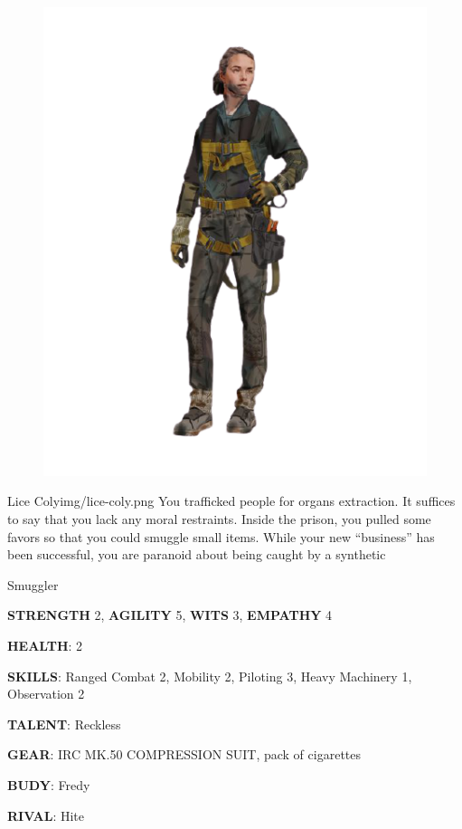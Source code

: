 \begin{figure}
    \hspace*{-2in}
    \includegraphics[width=.85\textwidth]{img/bg/firefighter-5.png}
    \label{fig:refinery}
\end{figure}

\medskip \medskip \medskip \medskip \medskip \medskip \medskip \medskip 

\begin{rpg-pcbox}{Lice Coly}{img/lice-coly.png}
    You trafficked people for organs extraction. It suffices to say that you lack any moral restraints.
    Inside the prison, you pulled some favors so that you could smuggle small items. While your new ``business'' has been successful, you are paranoid about being caught by a synthetic
\end{rpg-pcbox}

\begin{rpg-commentbox}{}
    Smuggler

    \textbf{STRENGTH} 2, \textbf{AGILITY} 5, \textbf{WITS} 3, \textbf{EMPATHY} 4

    \textbf{HEALTH}: 2

    \textbf{SKILLS}: Ranged Combat 2, Mobility 2, Piloting 3, Heavy Machinery 1, Observation 2
    
    \textbf{TALENT}: Reckless
    
    \textbf{GEAR}: IRC MK.50 COMPRESSION SUIT, pack of cigarettes

    \textbf{BUDY}: Fredy
    
    \textbf{RIVAL}: Hite
\end{rpg-commentbox}

